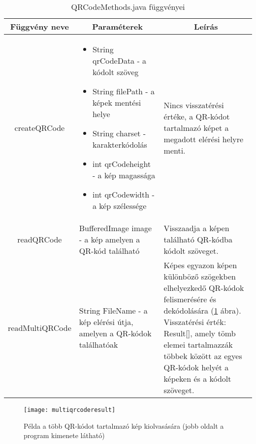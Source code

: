 \documentclass[../documentation.tex]{subfiles}
\begin{document}
\begin{table}[h]
\centering
\renewcommand\tabularxcolumn[1]{m{#1}}%
\begin{tabularx}{\linewidth}{|c|X|X|}
\hline \multicolumn{1}{|c|}{\textbf{Függvény neve}} & \multicolumn{1}{c|}{\textbf{Paraméterek}} & \multicolumn{1}{c|}{\textbf{Leírás}}\tabularnewline \hline
createQRCode & 
\begin{itemize} \item String qrCodeData - a kódolt szöveg
					\item String filePath - a képek mentési helye
					\item String charset - karakterkódolás
					\item int qrCodeheight - a kép magassága
					\item int qrCodewidth - a kép szélessége
\end{itemize} & Nincs visszatérési értéke, a QR-kódot tartalmazó képet a megadott elérési helyre menti. \tabularnewline \hline
readQRCode & BufferedImage image - a kép amelyen a QR-kód található & Visszaadja a képen található QR-kódba kódolt szöveget. \tabularnewline \hline
readMultiQRCode & String FileName - a kép elérési útja, amelyen a QR-kódok találhatóak & Képes egyazon képen különböző szögekben elhelyezkedő QR-kódok felismerésére és dekódolására (\ref{fig:multiqrcoderead} ábra). Visszatérési érték: Result[], amely tömb elemei tartalmazzák többek között az egyes QR-kódok helyét a képeken és a kódolt szöveget. \tabularnewline \hline
\end{tabularx}
\caption{QRCodeMethods.java függvényei}
\label{tab:qrcodemethods}
\end{table}

\begin{figure}[h]
\centering
{}
\texttt{[image: multiqrcoderesult]}
\caption{Példa a több QR-kódot tartalmazó kép kiolvasására (jobb oldalt a program kimenete látható)}
\label{fig:multiqrcoderead}
\end{figure}
\end{document}

